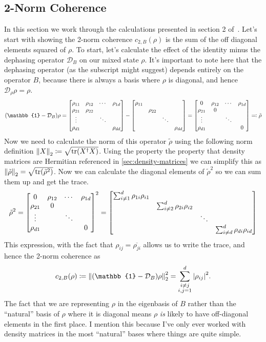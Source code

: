 \documentclass[11pt]{article}
\theoremstyle{definition}
\newcommand{\twonorm}[1][\rho]{c_{2,B} (#1)}
\newcommand{\dephase}{\mathcal{D}_B}
\begin{document}
\subsection{2-Norm Coherence}
In this section we work through the calculations presented in section 2 of~\cite{dynamic-entropies}.
Let's start with showing the 2-norm coherence $\twonorm{}$ is the sum of the off diagonal elements squared of $\rho$.
To start, let's calculate the effect of the identity minus the dephasing operator $\dephase$ on our mixed state $\rho$.
It's important to note here that the dephasing operator (as the subscript might suggest) depends entirely on the operator $B$, because there is always a basis where $\rho$ is diagonal, and hence $\mathcal{D}_\rho\rho = \rho$.
\begin{equation*}
	\qty(\mathbb{1} - \dephase)\rho = \mqty[\rho_{11} & \rho_{12} & \cdots & \rho_{1d} \\ \rho_{21} & \rho_{22} & & \\ \vdots & & \ddots & \\ \rho_{d1} & & & \rho_{dd}] - \mqty[\diagonalmatrix{\rho_{11},\rho_{22},\ddots,\rho_{dd}}] = \mqty[0 & \rho_{12} & \cdots & \rho_{1d} \\ \rho_{21} & 0 & & \\ \vdots & & \ddots & \\ \rho_{d1} & & & 0] \eqqcolon \tilde{\rho}
\end{equation*}
Now we need to calculate the norm of this operator $\tilde{\rho}$ using the following norm definition $\norm{X}_2 \coloneqq \sqrt{\tr(X^\dagger X)}$.
Using the property the property that density matrices are Hermitian referenced in \cref{sec:density-matrices} we can simplify this as $\norm{\tilde{\rho}}_2 = \sqrt{\tr(\tilde{\rho}^2)}$.
Now we can calculate the diagonal elements of $\tilde{\rho}^2$ so we can sum them up and get the trace.
\begin{align*}
	\tilde{\rho}^2 = \mqty[0 & \rho_{12} & \cdots & \rho_{1d} \\ \rho_{21} & 0 & & \\ \vdots & & \ddots & \\ \rho_{d1} & & & 0]^2  = \mqty[\dmat{\sum_{i \neq 1 }^d\rho_{1i}\rho_{i1},\sum_{i \neq 2}^d\rho_{2i}\rho_{i2},\ddots, \sum_{i \neq d}^d\rho_{di}\rho_{id}}]
\end{align*}
This expression, with the fact that $\rho_{ij} = \overline{\rho_{ji}}$ allows us to write the trace, and hence the 2-norm coherence as
\begin{equation}\label{eq:2norm}
	\twonorm{} \coloneqq\norm{\qty(\mathbb{1} - \dephase)\rho}_2^2 = \sum_{\substack{i\neq j \\ i,j = 1}}^d\abs{\rho_{ij}}^2.
\end{equation}
The fact that we are representing $\rho$ in the eigenbasis of $B$ rather than the ``natural'' basis of $\rho$ where it is diagonal means $\rho$ \emph{is} likely to have off-diagonal elements in the first place. I mention this because I've only ever worked with density matrices in the most ``natural'' bases where things are quite simple.
\end{document}
